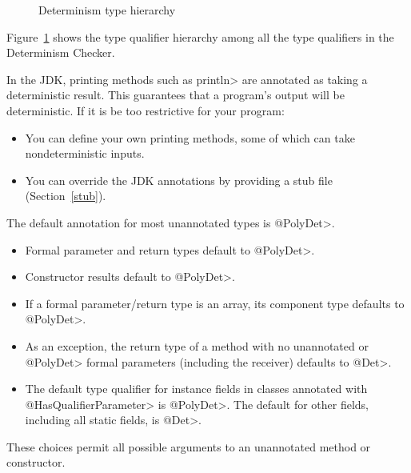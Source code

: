 \begin{figure}
    \begin{center}
    \end{center}
    \caption{Determinism type hierarchy}
    \label{fig-determinism-all-hierarchy}
\end{figure}
Figure~\ref{fig-determinism-all-hierarchy} shows the type qualifier hierarchy among all the
type qualifiers in the Determinism Checker.


In the JDK, printing methods such as \<println> are annotated as taking a
deterministic result.  This guarantees that a program's output will be
deterministic.  If it is be too restrictive for your program:
\begin{itemize}
\item
  You can define your own printing methods, some of which can take
  nondeterministic inputs.
\item
  You can override the JDK annotations by providing a stub file
  (Section~\ref{stub}).
\end{itemize}



The default annotation for most unannotated types is \<@PolyDet>.

\begin{itemize}
\item
  Formal parameter and return types default to \<@PolyDet>.
\item
  Constructor results default to \<@PolyDet>.
\item
  If a formal parameter/return type is an array, its component type defaults to
  \<@PolyDet>.
\item
  As an exception, the return type of a method with no unannotated or
  \<@PolyDet> formal parameters (including the receiver) defaults to
  \<@Det>.
\item
  The default type qualifier for instance fields in classes annotated with
  \<@HasQualifierParameter> is \<@PolyDet>. The default for other fields,
  including all static fields, is \<@Det>.
\end{itemize}

These choices permit all possible arguments to an unannotated method or
constructor.

